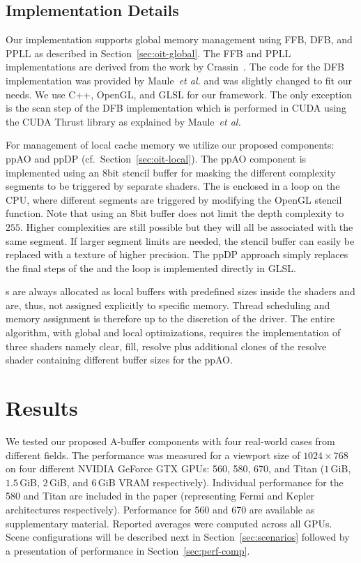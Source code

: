 \documentclass{egpubl}
\def\etal{\emph{et al.}}
\newcommand{\ab}{\mbox{A-buffer}}
\newcommand{\stencil}{ppAO}
\newcommand{\dloop}{ppDP}
\begin{document}
\subsection{Implementation Details}

Our implementation supports global memory management using FFB, DFB, and PPLL as described in Section~\ref{sec:oit-global}. 
The FFB and PPLL implementations are derived from the work by Crassin~\cite{Crassin2010}.
The code for the DFB implementation was provided by Maule~\etal \cite{Maule2012} and was slightly changed to fit our needs.
We use C++, OpenGL, and GLSL for our framework.
The only exception is the scan step of the DFB implementation which is performed in CUDA using the CUDA Thrust library as explained by Maule~\etal

For management of local cache memory we utilize our proposed components: \stencil{} and \dloop{} (cf.~Section~\ref{sec:oit-local}). 
The \stencil{} component is implemented using an 8bit stencil buffer for masking the different complexity segments to be triggered by separate shaders.  
The \sFill{} is enclosed in a loop on the CPU, where different segments are triggered by modifying the OpenGL stencil function. 
Note that using an $8$bit buffer does not limit the depth complexity to $255$.
Higher complexities are still possible but they will all be associated with the same segment. 
If larger segment limits are needed, the stencil buffer can easily be replaced with a texture of higher precision. 
The \dloop{} approach simply replaces the final steps of the \sResolve{} and the loop is implemented directly in GLSL. 

\bArray{}s are always allocated as local buffers with predefined sizes inside the shaders and are, thus, not assigned explicitly to specific memory. 
Thread scheduling and memory assignment is therefore up to the discretion of the driver.
The entire algorithm, with global and local optimizations, requires the implementation of three shaders namely clear, fill, resolve plus additional clones of the resolve shader containing different buffer sizes for the \stencil{}.




\section{Results}
\label{sec:results}

We tested our proposed \ab{} components with four real-world cases from different fields.
The performance was measured for a viewport size of $1024 \times 768$ on four different NVIDIA GeForce GTX GPUs: 
560, 580, 670, and Titan ($1$\,GiB, $1.5$\,GiB, $2$\,GiB, and $6$\,GiB VRAM respectively).
%
Individual performance for the 580 and Titan are included in the paper (representing Fermi and Kepler architectures respectively). 
Performance for 560 and 670 are available as supplementary material. 
Reported averages were computed across all GPUs. 
Scene configurations will be described next in Section~\ref{sec:scenarios} followed by a presentation of performance in Section~\ref{sec:perf-comp}.
\end{document}
